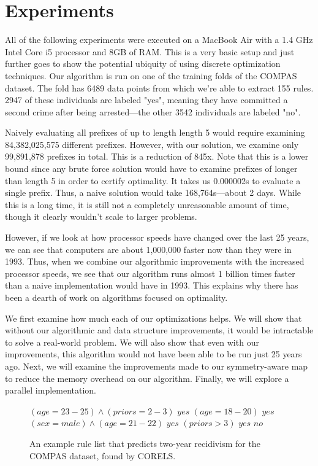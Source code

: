 \chapter{Experiments}

All of the following experiments were executed on a MacBook Air with a 1.4 GHz Intel Core i5 processor and 8GB of RAM.
This is a very basic setup and just further goes to show the potential ubiquity of using discrete optimization techniques.
Our algorithm is run on one of the training folds of the COMPAS dataset.
The fold has 6489 data points from which we're able to extract 155 rules.
2947 of these individuals are labeled "yes", meaning they have committed a second crime after being arrested---the other 3542 individuals are labeled "no".

Naively evaluating all prefixes of up to length length 5 would require examining 84,382,025,575 different prefixes.
However, with our solution, we examine only 99,891,878 prefixes in total.
This is a reduction of 845x.
Note that this is a lower bound since any brute force solution would have to examine prefixes of longer than length 5 in order to certify optimality.
It takes us 0.000002s to evaluate a single prefix.
Thus, a naive solution would take 168,764s---about 2 days.
While this is a long time, it is still not a completely unreasonable amount of time, though it clearly wouldn't scale to larger problems.

However, if we look at how processor speeds have changed over the last 25 years, we can see that computers are about 1,000,000 faster now than they were in 1993. \cite{Supercomputer}
Thus, when we combine our algorithmic improvements with the increased processor speeds, we see that our algorithm runs almost 1 billion times faster than a naive implementation would have in 1993.
This explains why there has been a dearth of work on algorithms focused on optimality.

We first examine how much each of our optimizations helps.
We will show that without our algorithmic and data structure improvements, it would be intractable to solve a real-world problem.
We will also show that even with our improvements, this algorithm would not have been able to be run just 25 years ago.
Next, we will examine the improvements made to our symmetry-aware map to reduce the memory overhead on our algorithm.
Finally, we will explore a parallel implementation.

\begin{figure}[t!]
\begin{algorithmic}
\normalsize
\State \bif $(age=23-25) \wedge (priors=2-3)$ \bthen $yes$
\State \belif $(age=18-20)$ \bthen $yes$
\State \belif $(sex=male) \wedge (age=21-22)$ \bthen $yes$
\State \belif $(priors>3)$ \bthen $yes$
\State \belse $no$
\end{algorithmic}
\caption{An example rule list that predicts two-year recidivism for the COMPAS dataset, found by CORELS.}
\label{fig:rule-list}
\end{figure}

